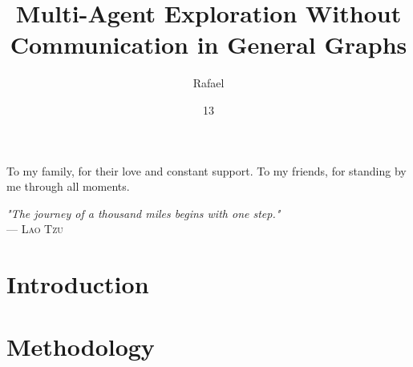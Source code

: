 \documentclass[tg, eng]{ita}    %
\author{Rafael}{Studart Mattos Di Piero}
\title{Multi-Agent Exploration Without Communication in General Graphs}
\date{13}{Nov}{2024}
\begin{document}
\maketitle

\begin{itadedication}
  To my family, for their love and constant support. 
  To my friends, for standing by me through all moments. 
\end{itadedication}

\begin{itathanks}

\end{itathanks}


\thispagestyle{empty}
\ifhyperref{}\fi
\begin{flushright}
\begin{spacing}{1}
\mbox{}\vfill
{\sffamily\itshape
"The journey of a thousand miles begins with one step."\\
}
--- \textsc{
Lao Tzu
}
\end{spacing}
\end{flushright}

\begin{abstract}
\noindent

\end{abstract}

\begin{englishabstract}
\noindent

\end{englishabstract}

\listoffigures %


\listofalgorithms %



\tableofcontents

\mainmatter

\chapter{Introduction}


\chapter{Methodology}

\end{document}
